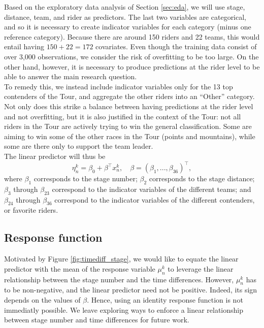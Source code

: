 \documentclass[aos,preprint]{imsart}
\begin{document}
Based on the exploratory data analysis of Section \ref{sec:eda}, we will use stage, distance, team, and rider as predictors. The last two variables are categorical, and so it is necessary to create indicator variables for each category (minus one reference category). Because there are around 150 riders and 22 teams, this would entail having $150+22 = 172$ covariates. Even though the training data consist of over 3,000 observations, we consider the risk of overfitting to be too large. On the other hand, however, it is necessary to produce predictions at the rider level to be able to answer the main research question. \\

To remedy this, we instead include indicator variables only for the 13 top contenders of the Tour, and aggregate the other riders into an ``Other'' category. Not only does this strike a balance between having predictions at the rider level and not overfitting, but it is also justified in the context of the Tour: not all riders in the Tour are actively trying to win the general classification. Some are aiming to win some of the other races in the Tour (points and mountains), while some are there only to support the team leader. \\

The linear predictor will thus be
\[
  \eta_n^k = \beta_0 + \beta^\top x_n^k, \quad \beta = (\beta_1, ..., \beta_{36})^\top,
\]
where $\beta_1$ corresponds to the stage number; $\beta_2$ corresponds to the stage distance; $\beta_3$ through $\beta_{23}$ correspond to the indicator variables of the different teams; and $\beta_{24}$ through $\beta_{36}$ correspond to the indicator variables of the different contenders, or favorite riders.




\subsection{Response function}



Motivated by Figure \ref{fig:timediff_stage}, we would like to equate the linear predictor with the mean of the response variable $\mu_n^k$ to leverage the linear relationship between the stage number and the time differences. However, $\mu_n^k$ has to be non-negative, and the linear predictor need not be positive. Indeed, its sign depends on the values of $\beta$. Hence, using an identity response function is not immediatly possible. We leave exploring ways to enforce a linear relationship between stage number and time differences for future work. \\
\end{document}
